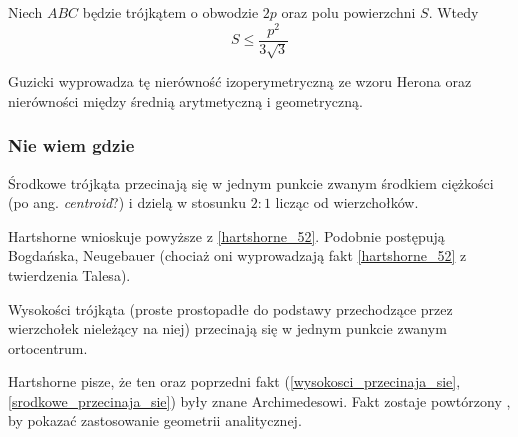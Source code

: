 \begin{proposition}
	Niech $ABC$ będzie trójkątem o obwodzie $2p$ oraz polu powierzchni $S$.
	Wtedy
	\begin{equation}
		S \le \frac{p^2}{3 \sqrt{3}}
	\end{equation}
\end{proposition}

Guzicki wyprowadza tę nierówność izoperymetryczną ze wzoru Herona oraz nierówności między średnią arytmetyczną i geometryczną.


\subsubsection{Nie wiem gdzie}

\begin{proposition}
	\label{srodkowe_przecinaja_sie}
	Środkowe trójkąta przecinają się w jednym punkcie zwanym środkiem ciężkości (po ang. \emph{centroid}?) i dzielą w stosunku $2 : 1$ licząc od wierzchołków.
\end{proposition}

Hartshorne \cite[s. 53, 54]{hartshorne2000} wnioskuje powyższe z \ref{hartshorne_52}.
Podobnie postępują Bogdańska, Neugebauer (chociaż oni wyprowadzają fakt \ref{hartshorne_52} z twierdzenia Talesa).

\begin{proposition}
	\label{wysokosci_przecinaja_sie}
	Wysokości trójkąta (proste prostopadłe do podstawy przechodzące przez wierzchołek nieleżący na niej) przecinają się w jednym punkcie zwanym ortocentrum.
\end{proposition}

Hartshorne \cite[s. 52, 54]{hartshorne2000} pisze, że ten oraz poprzedni fakt (\ref{wysokosci_przecinaja_sie}, \ref{srodkowe_przecinaja_sie}) były znane Archimedesowi.
Fakt zostaje powtórzony \cite[s. 119-120]{hartshorne2000}, by pokazać zastosowanie geometrii analitycznej.


